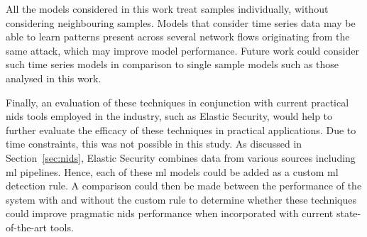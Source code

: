 All the models considered in this work treat samples individually, without
considering neighbouring samples. Models that consider time series data may be
able to learn patterns present across several network flows originating from
the same attack, which may improve model performance. Future work could
consider such time series models in comparison to single sample models such as
those analysed in this work.

Finally, an evaluation of these techniques in conjunction with current
practical \gls{nids} tools employed in the industry, such as Elastic Security,
would help to further evaluate the efficacy of these techniques in practical
applications. Due to time constraints, this was not possible in this study. As
discussed in Section~\ref{sec:nids}, Elastic Security combines data from
various sources including \gls{ml} pipelines. Hence, each of these \gls{ml} models
could be added as a custom \gls{ml} detection rule. A comparison could then be
made between the performance of the system with and without the custom rule to
determine whether these techniques could improve pragmatic \gls{nids}
performance when incorporated with current state-of-the-art tools.